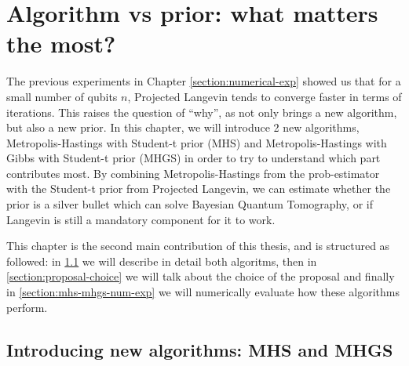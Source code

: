 \documentclass[12pt]{memoir}
\begin{document}
\chapter{Algorithm vs prior: what matters the most?}\label{section:algo-vs-prior}
The previous experiments in Chapter \ref{section:numerical-exp} showed us that for a small number of qubits $n$, Projected Langevin tends to converge faster in terms of iterations. This raises the question of ``why'', as \cite{meth:bayesian:Langevin:ACMT2024} not only brings a new algorithm, but also a new prior. In this chapter, we will introduce 2 new algorithms, Metropolis-Hastings with Student-t prior (MHS) and Metropolis-Hastings with Gibbs with Student-t prior (MHGS) in order to try to understand which part contributes most. By combining Metropolis-Hastings from the prob-estimator with the Student-t prior from Projected Langevin, we can estimate whether the prior is a silver bullet which can solve Bayesian Quantum Tomography, or if Langevin is still a mandatory component for it to work.\medbreak

This chapter is the second main contribution of this thesis, and is structured as followed: in \ref{section:mhs-and-mhgs} we will describe in detail both algoritms, then in \ref{section:proposal-choice} we will talk about the choice of the proposal and finally in \ref{section:mhs-mhgs-num-exp} we will numerically evaluate how these algorithms perform.
\section{Introducing new algorithms: MHS and MHGS}\label{section:mhs-and-mhgs}
\end{document}
